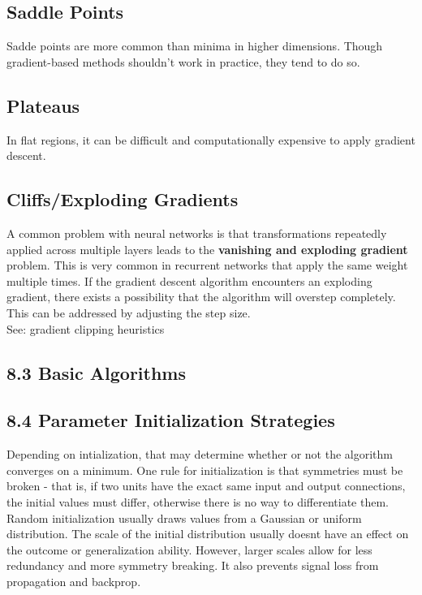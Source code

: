 \documentclass[a4paper]{report}
\begin{document}
\subsection{Saddle Points}
Sadde points are more common than minima in higher dimensions. Though gradient-based methods shouldn't work in practice, they tend to do so.

\subsection{Plateaus}
In flat regions, it can be difficult and computationally expensive to apply gradient descent.

\subsection{Cliffs/Exploding Gradients}
A common problem with neural networks is that transformations repeatedly applied across multiple layers leads to the \textbf{vanishing and exploding gradient} problem. This is very common in recurrent networks that apply the same weight multiple times. If the gradient descent algorithm encounters an exploding gradient, there exists a possibility that the algorithm will overstep completely. This can be addressed by adjusting the step size.\\
See: gradient clipping heuristics

\subsection{8.3 Basic Algorithms}

\subsection{8.4 Parameter Initialization Strategies}
Depending on intialization, that may determine whether or not the algorithm converges on a minimum. One rule for initialization is that symmetries must be broken - that is, if two units have the exact same input and output connections, the initial values must differ, otherwise there is no way to differentiate them.\\
Random initialization usually draws values from a Gaussian or uniform distribution. The scale of the initial distribution usually doesnt have an effect on the outcome or generalization ability. However, larger scales allow for less redundancy and more symmetry breaking. It also prevents signal loss from propagation and backprop.
\end{document}
